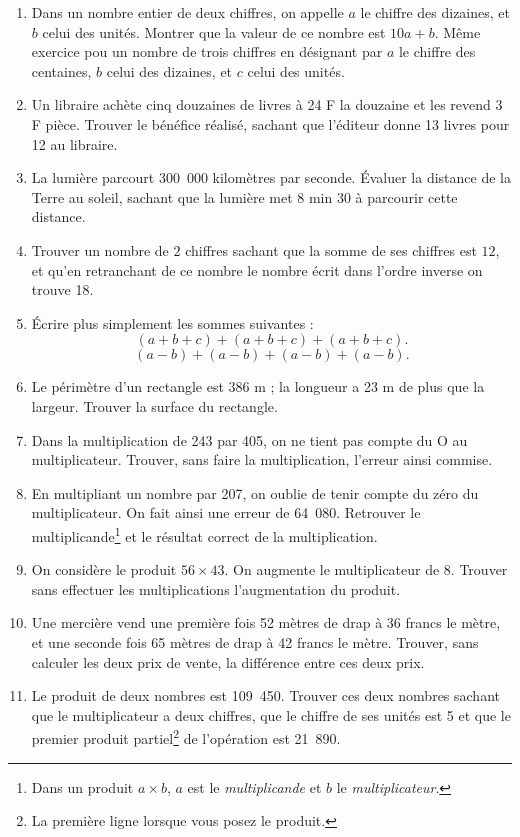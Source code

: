 \documentclass[12 pt]{extarticle}
\theoremstyle{plain}
\begin{document}
 \begin{enumerate}
 \item Dans un nombre entier de deux chiffres, on appelle $a$ le chiffre des dizaines, et $b$ celui des unités. Montrer que la valeur de ce nombre est $10a+b$.
 Même exercice pou un nombre de trois chiffres en désignant par $a$ le chiffre des centaines, $b$ celui des dizaines, et $c$ celui des unités.
 \item Un libraire achète cinq douzaines de livres à 
 24 F la douzaine et les revend 3 F pièce. Trouver le 
 bénéfice réalisé, sachant que l'éditeur donne 13 livres pour 12 au libraire. 
 \item La lumière parcourt 300~000 kilomètres par
 seconde. Évaluer la distance de la Terre au soleil,
 sachant que la lumière met $8$ min $30$ à parcourir
 cette distance.
 \item Trouver un nombre de $2$ chiffres sachant que la somme de ses chiffres est $12$, et qu'en 
 retranchant de ce nombre le nombre écrit dans l'ordre
 inverse on trouve 18. 
 \item Écrire plus simplement les sommes suivantes :
 \[ (a + b + c) + (a + b + c) + (a + b + c).\]
 \[(a - b) + (a - b) + (a - b) + (a - b).\]
 \item Le périmètre d'un rectangle est 386 m ; 
 la longueur a 23 m de plus que la largeur.
 Trouver la surface du rectangle.
 \item Dans la multiplication de 243 par 405, on ne tient pas compte du O au multiplicateur. Trouver, sans faire la multiplication, l'erreur ainsi commise. 
 \item En multipliant un nombre par 207, on oublie de 
 tenir compte du zéro du multiplicateur. On fait ainsi
 une erreur de 64~080. Retrouver le multiplicande\footnote{Dans un produit $a\times b$, $a$ est le \emph{multiplicande} et $b$ le \emph{multiplicateur}.} et le résultat correct de la multiplication.
 \item On considère le produit $56 \times 43$. On augmente le multiplicateur de $8$. Trouver sans effectuer les multiplications l'augmentation du produit. 
 \item Une mercière vend une première fois 52 mètres de drap à 36 francs le mètre, et une seconde fois 65 mètres de drap à 42 francs le mètre. Trouver, sans calculer les deux prix de vente, la différence entre ces deux prix. 
 \item Le produit de deux nombres est 109~450. Trouver ces deux nombres sachant que le multiplicateur a deux chiffres, que le chiffre de ses unités est 5 et que le premier produit partiel\footnote{La première ligne lorsque vous posez le produit.} de l'opération est 21~890. 

\end{enumerate}
\end{document}
